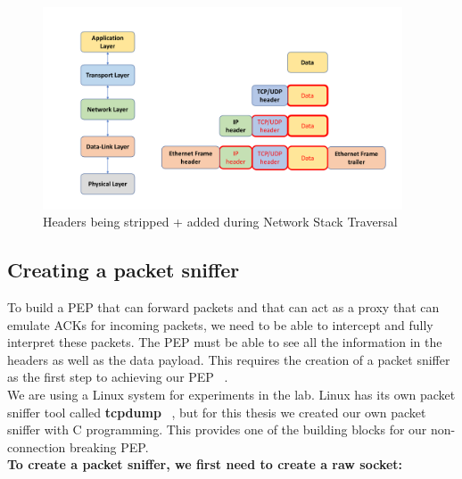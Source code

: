 \begin{figure}[h!]
    \centering
    \includegraphics[width=0.95\textwidth]{NetworkTraversal.pdf}
    \caption{Headers being stripped + added during Network Stack Traversal
    }
    \label{fig:Socket}
\end{figure}

\subsection{Creating a packet sniffer}
To build a PEP that can forward packets and that can act as a proxy that can emulate ACKs for incoming packets, we need to be able to intercept and fully interpret these packets. The PEP must be able to see all the information in the headers as well as the data payload. This requires the creation of a packet sniffer as the first step to achieving our PEP ~\cite{38}. \\

We are using a Linux system for experiments in the lab. Linux has its own packet sniffer tool called \textbf{tcpdump} ~\cite{35}, but for this thesis we created our own packet sniffer with C programming. This provides one of the building blocks for our non-connection breaking PEP. \\

\textbf{To create a packet sniffer, we first need to create a raw socket:} \\

